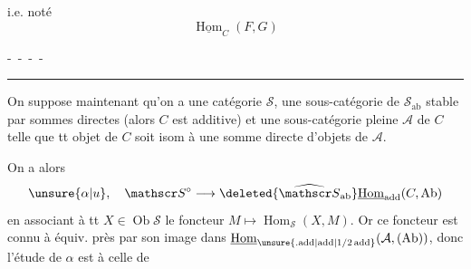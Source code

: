 i.e.
noté
\[
 \underline{\operatorname{Hom}}_C(F,G)
\]

-\, -\, -\, -

\noindent\hfil\rule{0.4\linewidth}{0.35pt}\hfil

On suppose maintenant qu'on a
une catégorie $\mathscr S$, une sous-catégorie
 de $\mathscr S_{\mathrm{ab}}$ stable par sommes directes
(alors $C$ est additive) et une
sous-catégorie pleine $\mathcal A$ de $C$ telle
que tt objet de $C$ soit isom à une
somme directe   d'objets de $\mathcal A$.

On a alors 
\[
 \unsure{\alpha|u},\quad \mathscr S^\circ\longrightarrow
 \deleted{\widehat{\mathscr S}_{\mathrm{ab}}}
 \underline{\operatorname{Hom}}_{\mathrm{add}}(C,\mathrm{Ab})
\]
 en associant à tt $X\in\operatorname{Ob}\mathscr S$
le foncteur $M\longmapsto\operatorname{Hom}_{\mathscr S}(X,M)$.
Or ce foncteur est connu à équiv.
près par   son image
dans $\underline{\operatorname{Hom}}_{\unsure{.\mathrm{add}|\mathrm{add}|1/2\,\mathrm{add}}}(\mathcal A,(\mathrm{Ab}))$, donc l'étude
de $\alpha$ est  à celle de
